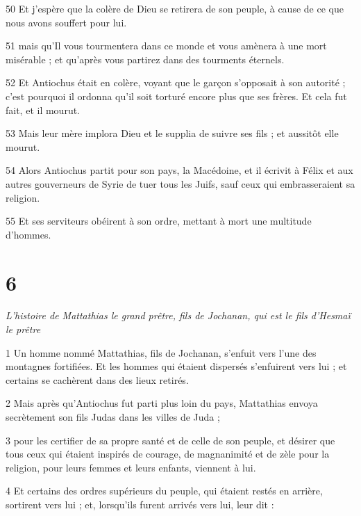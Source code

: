 \par 50 Et j'espère que la colère de Dieu se retirera de son peuple, à cause de ce que nous avons souffert pour lui.

\par 51 mais qu'Il vous tourmentera dans ce monde et vous amènera à une mort misérable ; et qu'après vous partirez dans des tourments éternels.

\par 52 Et Antiochus était en colère, voyant que le garçon s'opposait à son autorité ; c'est pourquoi il ordonna qu'il soit torturé encore plus que ses frères. Et cela fut fait, et il mourut.

\par 53 Mais leur mère implora Dieu et le supplia de suivre ses fils ; et aussitôt elle mourut.

\par 54 Alors Antiochus partit pour son pays, la Macédoine, et il écrivit à Félix et aux autres gouverneurs de Syrie de tuer tous les Juifs, sauf ceux qui embrasseraient sa religion.

\par 55 Et ses serviteurs obéirent à son ordre, mettant à mort une multitude d'hommes.

\chapter{6}

\par \textit{L'histoire de Mattathias le grand prêtre, fils de Jochanan, qui est le fils d'Hesmaï le prêtre}

\par 1 Un homme nommé Mattathias, fils de Jochanan, s'enfuit vers l'une des montagnes fortifiées. Et les hommes qui étaient dispersés s'enfuirent vers lui ; et certains se cachèrent dans des lieux retirés.

\par 2 Mais après qu'Antiochus fut parti plus loin du pays, Mattathias envoya secrètement son fils Judas dans les villes de Juda ;

\par 3 pour les certifier de sa propre santé et de celle de son peuple, et désirer que tous ceux qui étaient inspirés de courage, de magnanimité et de zèle pour la religion, pour leurs femmes et leurs enfants, viennent à lui.

\par 4 Et certains des ordres supérieurs du peuple, qui étaient restés en arrière, sortirent vers lui ; et, lorsqu'ils furent arrivés vers lui, leur dit :

